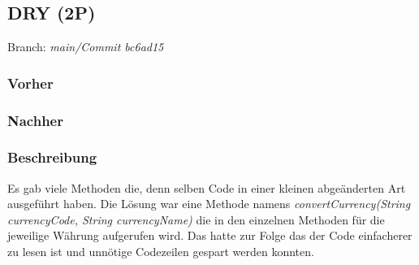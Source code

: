 \subsection{DRY (2P)}

Branch: \textit{main/Commit bc6ad15} 
\subsubsection*{Vorher}

\subsubsection*{Nachher}

\subsubsection*{Beschreibung}
Es gab viele Methoden die, denn selben Code in einer kleinen abgeänderten Art ausgeführt haben. Die Lösung war eine Methode namens \textit{convertCurrency(String currencyCode, String currencyName)} die in den einzelnen Methoden für die jeweilige Währung aufgerufen wird. 
\newline\newline
Das hatte zur Folge das der Code einfacherer zu lesen ist und unnötige Codezeilen gespart werden konnten. 
